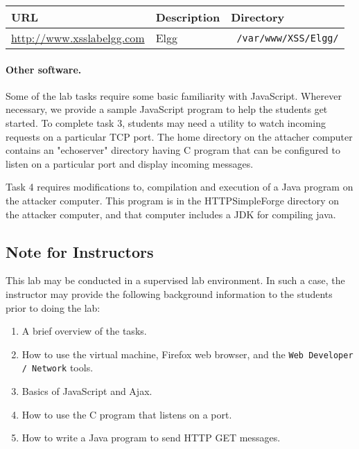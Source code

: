 \newcommand{\urlorurls}{URL }
\newcommand{\urlisorurlsare}{URL is }





\vspace{0.1in}
\begin{tabular}{|l|l|l|}
\hline
URL & Description & Directory\\
\hline
\url{http://www.xsslabelgg.com} & Elgg & {\tt
/var/www/XSS/Elgg/} \\
\hline
\end{tabular}
\vspace{0.1in}




\paragraph{Other software.}
Some of the lab tasks require some basic familiarity with
JavaScript. Wherever necessary, we provide a sample JavaScript program
to help the students get started. To complete task 3, students may
need a utility to watch incoming requests on a particular TCP port. The
home directory on the attacher computer contains an "echoserver" directory having
C program that can be configured to listen on a particular
port and display incoming messages. 

Task 4 requires modifications to, compilation and execution of a Java program
on the attacker computer.  This program is in the HTTPSimpleForge directory
on the attacker computer, and that computer includes a JDK for compiling java.


\subsection{Note for Instructors} 

This lab may be conducted in a
supervised lab environment. In such a case, the instructor may provide
the following background information to the students prior to doing
the lab:
\begin{enumerate}
  \item A brief overview of the tasks.
  \item How to use the virtual machine, Firefox web browser, and the
    {\tt Web Developer / Network} tools.
  \item Basics of JavaScript and Ajax.
  \item How to use the C program that listens on a port. 
  \item How to write a Java program to send HTTP GET messages. 	
\end{enumerate}

